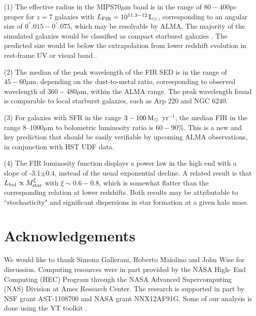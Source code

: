 (1) The effective radius in the MIPS$70\mu$m band is in the range of $80-400$pc proper for $z=7$ galaxies with $L_{\rm FIR}=10^{11.3-12}{\rm\,L_\odot}$,
corresponding to an angular size of $0^{''}.015-0^{''}.075$, which may be resolvable by ALMA.
The majority of the simulated galaxies would be classified as compact starburst galaxies \citep{2011Elbaz}.
The predicted size would be below the extrapolation from lower redshift evolution in rest-frame UV or visual band \citep[e.g.,][]{2004Ferguson, 2006Trujillo}.

(2) The median of the peak wavelength of the FIR SED is in the range of $45-60\mu$m, depending on the dust-to-metal ratio,
corresponding to observed wavelength of $360-480\mu$m, within the ALMA range.
The peak wavelength found is comparable to local starburst galaxies, such as Arp 220 and NGC 6240.

(3) For galaxies with SFR in the range $3-100{\rm\,M_\odot}$~yr$^{-1}$, the median FIR in the range 8--1000$\mu$m to bolometric luminosity ratio is $60-90\%$.
This is a new and key prediction that should be easily verifiable by upcoming ALMA observations, in conjunction with HST UDF data.

(4) The FIR luminosity function displays a power law in the high end with a slope of -3.1$\pm$0.4, instead of the usual exponential decline.
A related result is that $L_{\rm bol}\propto M_{\rm star}^\xi$ with $\xi\sim 0.6-0.8$,
which is somewhat flatter than the corresponding relation at lower redshifts.
Both results may be attributable to ``stochasticity" and significant dispersions in star formation at a given halo mass.


\section*{Acknowledgements}
We would like to thank Simona Gallerani, Roberto Maiolino and John Wise for discussion.
Computing resources were in part provided by the NASA High-
End Computing (HEC) Program through the NASA Advanced
Supercomputing (NAS) Division at Ames Research Center.
The research is supported in part by NSF grant AST-1108700 and NASA grant NNX12AF91G.
Some of our analysis is done using the {\sc YT} toolkit \citep{turk11}. 









